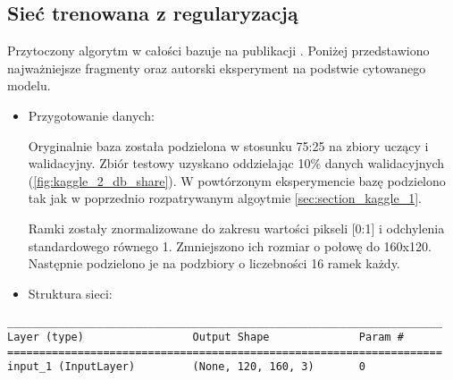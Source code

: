 \subsection{Sieć trenowana z regularyzacją}
\label{sec:section_kaggle_2}
Przytoczony algorytm w całości bazuje na publikacji \cite{kaggle_2}. Poniżej przedstawiono najważniejsze fragmenty oraz autorski eksperyment na podstwie cytowanego modelu.

{\parindent0pt %
\begin{itemize}
\item Przygotowanie danych:

Oryginalnie baza została podzielona w stosunku 75:25 na zbiory uczący i walidacyjny. Zbiór testowy uzyskano oddzielając 10\% danych walidacyjnych (\ref{fig:kaggle_2_db_share}). W powtórzonym eksperymencie bazę podzielono tak jak w poprzednio rozpatrywanym algoytmie \ref{sec:section_kaggle_1}.

Ramki zostały znormalizowane do zakresu wartości pikseli [0:1] i odchylenia standardowego równego 1. Zmniejszono ich rozmiar o połowę do 160x120. Następnie podzielono je na podzbiory o liczebności 16 ramek każdy.

\item Struktura sieci:
\end{itemize}

\newsavebox\myv
\begin{lrbox}{\myv}
\setlength{\myminipagewidth}{0.9\linewidth} %
\setlength{\myminipagecentering}{(\linewidth-\myminipagewidth)/2}
\noindent\hspace{\myminipagecentering}\begin{minipage}{\myminipagewidth}
\begin{verbatim}
____________________________________________________________________
Layer (type)                 Output Shape              Param #   
====================================================================
input_1 (InputLayer)         (None, 120, 160, 3)       0        
\end{verbatim} 
\end{minipage}\end{lrbox}
\resizebox{0.75\textwidth}{!}{\usebox\myv}

}
